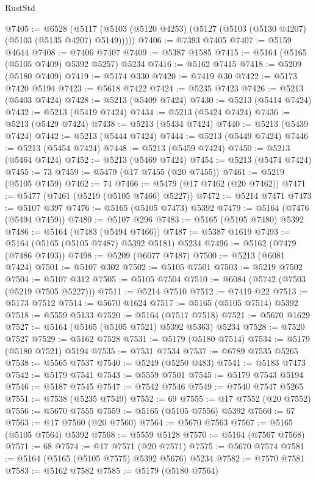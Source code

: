\begin{lexlean}{RustStd}
\begin{coremodule}
@7405 := @6528
    (@5117 (@5103 (@5120 @4253) (@5127 (@5103 (@5130 @4207) (@5103 (@5135 @4207) @5149)))))
@7406 := @7393 @7405
@7407 := @5159 @4644
@7408 := @7406 @7407
@7409 := @5387 @1585
@7415 := @5164 (@5165 (@5105 @7409) @5392 @5257) @5234
@7416 := @5162 @7415
@7418 := @5209 (@5180 @7409)
@7419 := @5174 @330
@7420 := @7419 @30
@7422 := @5173 @7420 @5194
@7423 := @5618 @7422
@7424 := @5235 @7423
@7426 := @5213 (@5403 @7424)
@7428 := @5213 (@5409 @7424)
@7430 := @5213 (@5414 @7424)
@7432 := @5213 (@5419 @7424)
@7434 := @5213 (@5424 @7424)
@7436 := @5213 (@5429 @7424)
@7438 := @5213 (@5434 @7424)
@7440 := @5213 (@5439 @7424)
@7442 := @5213 (@5444 @7424)
@7444 := @5213 (@5449 @7424)
@7446 := @5213 (@5454 @7424)
@7448 := @5213 (@5459 @7424)
@7450 := @5213 (@5464 @7424)
@7452 := @5213 (@5469 @7424)
@7454 := @5213 (@5474 @7424)
@7455 := 73
@7459 := @5479 (@17 @7455 (@20 @7455))
@7461 := @5219 (@5105 @7459)
@7462 := 74
@7466 := @5479 (@17 @7462 (@20 @7462))
@7471 := @5477 (@7461 (@5219 (@5105 @7466) @5227))
@7472 := @5214 @7471
@7473 := @5107 @397
@7476 := @5165 (@5105 @7473) @5392
@7479 := @5164 (@7476 (@5494 @7459))
@7480 := @5107 @296
@7483 := @5165 (@5105 @7480) @5392
@7486 := @5164 (@7483 (@5494 @7466))
@7487 := @5387 @1619
@7493 := @5164 (@5165 (@5105 @7487) @5392 @5181) @5234
@7496 := @5162 (@7479 (@7486 @7493))
@7498 := @5209 (@6077 @7487)
@7500 := @5213 (@6081 @7424)
@7501 := @5107 @302
@7502 := @5105 @7501
@7503 := @5219 @7502
@7504 := @5107 @312
@7505 := @5105 @7504
@7510 := @6084 (@5742 (@7503 (@5219 @7505 @5227)))
@7511 := @5214 @7510
@7512 := @7419 @22
@7513 := @5173 @7512
@7514 := @5670 @1624
@7517 := @5165 (@5105 @7514) @5392
@7518 := @5559 @5133
@7520 := @5164 (@7517 @7518)
@7521 := @5670 @1629
@7527 := @5164 (@5165 (@5105 @7521) @5392 @5363) @5234
@7528 := @7520 @7527
@7529 := @5162 @7528
@7531 := @5179 (@5180 @7514)
@7534 := @5179 (@5180 @7521) @5194
@7535 := @7531 @7534
@7537 := @6789 @7535 @5265
@7538 := @5565 @7537
@7540 := @5249 (@5250 @483)
@7541 := @5183 @7473
@7542 := @5179 @7541
@7543 := @5559 @7501
@7545 := @5179 @7543 @5194
@7546 := @5187 @7545
@7547 := @7542 @7546
@7549 := @7540 @7547 @5265
@7551 := @7538 (@5235 @7549)
@7552 := 69
@7555 := @17 @7552 (@20 @7552)
@7556 := @5670 @7555
@7559 := @5165 (@5105 @7556) @5392
@7560 := 67
@7563 := @17 @7560 (@20 @7560)
@7564 := @5670 @7563
@7567 := @5165 (@5105 @7564) @5392
@7568 := @5559 @5128
@7570 := @5164 (@7567 @7568)
@7571 := 68
@7574 := @17 @7571 (@20 @7571)
@7575 := @5670 @7574
@7581 := @5164 (@5165 (@5105 @7575) @5392 @5676) @5234
@7582 := @7570 @7581
@7583 := @5162 @7582
@7585 := @5179 (@5180 @7564)

\end{coremodule}
\end{lexlean}
